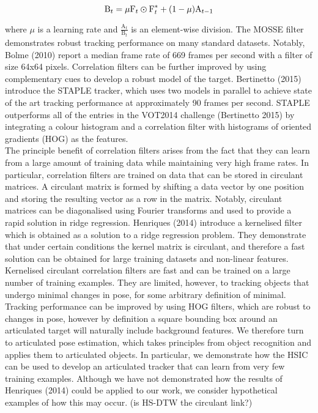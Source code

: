 \begin{equation}
\text{B}_t = \mu \text{F}_t \varodot \text{F}_t^* + (1 - \mu)\text{A}_{t-1}
\end{equation}

\noindent where $\mu$ is a learning rate and $\frac{\text{A}_t}{\text{B}_t}$ is an element-wise division. The MOSSE filter demonstrates robust tracking performance on many standard datasets. Notably, Bolme (2010) report a median frame rate of 669 frames per second with a filter of size 64x64 pixels. Correlation filters can be further improved by using complementary cues to develop a robust model of the target. Bertinetto (2015) introduce the STAPLE tracker, which uses two models in parallel to achieve state of the art tracking performance at approximately 90 frames per second. STAPLE outperforms all of the entries in the VOT2014 challenge (Bertinetto 2015) by integrating a colour histogram and a correlation filter with histograms of oriented gradients (HOG) as the features. \\

The principle benefit of correlation filters arises from the fact that they can learn from a large amount of training data while maintaining very high frame rates. In particular, correlation filters are trained on data that can be stored in circulant matrices. A circulant matrix is formed by shifting a data vector by one position and storing the resulting vector as a row in the matrix. Notably, circulant matrices can be diagonalised using Fourier transforms and used to provide a rapid solution in ridge regression. Henriques (2014) introduce a kernelised filter which is obtained as a solution to a ridge regression problem. They demonstrate that under certain conditions the kernel matrix is circulant, and therefore a fast solution can be obtained for large training datasets and non-linear features.  \\

Kernelised circulant correlation filters are fast and can be trained on a large number of training examples. They are limited, however, to tracking objects that undergo minimal changes in pose, for some arbitrary definition of minimal. Tracking performance can be improved by using HOG filters, which are robust to changes in pose, however by definition a square bounding box around an articulated target will naturally include background features. We therefore turn to articulated pose estimation, which takes principles from object recognition and applies them to articulated objects. In particular, we demonstrate how the HSIC can be used to develop an articulated tracker that can learn from very few training examples. Although we have not demonstrated how the results of Henriques (2014) could be applied to our work, we consider hypothetical examples of how this may occur. (is HS-DTW the circulant link?)  


